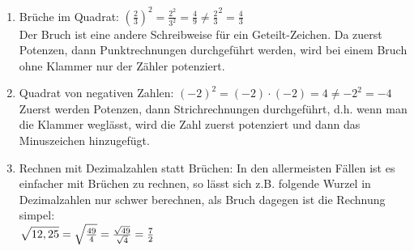 \newpage
\begin{enumerate}[label=\arabic*)]
	\item Brüche im Quadrat: \(\left(\frac{2}{3}\right) ^2=\frac{2^2}{3^2}=\frac{4}{9}\neq\frac{2}{3}^2=\frac{4}{3}\)\\
	Der Bruch ist eine andere Schreibweise für ein Geteilt-Zeichen. Da zuerst Potenzen, dann Punktrechnungen durchgeführt werden, wird bei einem Bruch ohne Klammer nur der Zähler potenziert.
	\item Quadrat von negativen Zahlen: \(\left( -2\right) ^2=\left( -2\right) \cdot\left( -2\right) =4\neq-2^2=-4\)\\
	Zuerst werden Potenzen, dann Strichrechnungen durchgeführt, d.h. wenn man die Klammer weglässt, wird die Zahl zuerst potenziert und dann das Minuszeichen hinzugefügt.
	\item Rechnen mit Dezimalzahlen statt Brüchen: In den allermeisten Fällen ist es einfacher mit Brüchen zu rechnen, so lässt sich z.B. folgende Wurzel in Dezimalzahlen nur schwer berechnen, als Bruch dagegen ist die Rechnung simpel:\\
	\(\sqrt{12,25\vphantom{A^2}}=\sqrt{\frac{49}{4}}=\frac{\sqrt{49}}{\sqrt{4}}=\frac{7}{2}\)
\end{enumerate}